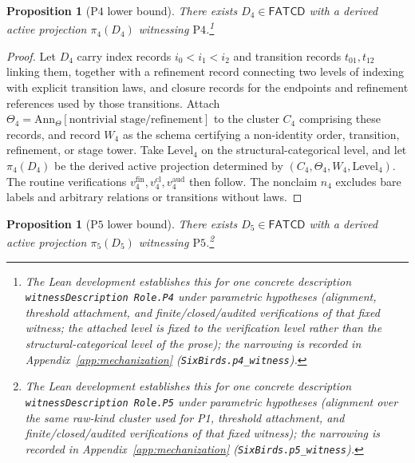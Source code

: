 \documentclass[11pt]{article}
\newtheorem{proposition}[theorem]{Proposition}
\theoremstyle{definition}
\newcommand{\FATCD}{\ensuremath{\mathsf{FATCD}}}
\newcommand{\Pfour}{\ensuremath{\mathrm{P4}}}
\newcommand{\Pfive}{\ensuremath{\mathrm{P5}}}
\begin{document}
\begin{proposition}[\Pfour{} lower bound]\label{prop:p4-witness}
There exists \(D_4 \in \FATCD{}\) with a derived active projection
\(\pi_4(D_4)\) witnessing \Pfour{}.\footnote{The Lean development establishes this for one concrete description \texttt{witnessDescription Role.P4} under parametric hypotheses (alignment, threshold attachment, and finite/closed/audited verifications of that fixed witness; the attached level is fixed to the verification level rather than the structural-categorical level of the prose); the narrowing is recorded in Appendix~\ref{app:mechanization} (\texttt{SixBirds.p4\_witness}).}
\end{proposition}

\begin{proof}
Let \(D_4\) carry index records \(i_0 < i_1 < i_2\) and transition
records \(t_{01}, t_{12}\) linking them, together with a refinement
record connecting two levels of indexing with explicit transition laws,
and closure records for the endpoints and refinement references used by
those transitions. Attach
\(\Theta_4 = \mathrm{Ann}_\Theta[\text{nontrivial stage/refinement}]\)
to the cluster \(C_4\) comprising these records, and record \(W_4\) as
the schema certifying a non-identity
order, transition, refinement, or stage tower. Take
\(\mathrm{Level}_4\) on the structural-categorical level, and let
\(\pi_4(D_4)\) be the derived active projection determined by
\((C_4,\Theta_4,W_4,\mathrm{Level}_4)\). The routine verifications
\(v_4^{\mathrm{fin}}, v_4^{\mathrm{cl}}, v_4^{\mathrm{aud}}\) then
follow. The nonclaim \(n_4\) excludes bare labels and arbitrary
relations or transitions without laws.
\end{proof}

\begin{proposition}[\Pfive{} lower bound]\label{prop:p5-witness}
There exists \(D_5 \in \FATCD{}\) with a derived active projection
\(\pi_5(D_5)\) witnessing \Pfive{}.\footnote{The Lean development establishes this for one concrete description \texttt{witnessDescription Role.P5} under parametric hypotheses (alignment over the same raw-kind cluster used for P1, threshold attachment, and finite/closed/audited verifications of that fixed witness); the narrowing is recorded in Appendix~\ref{app:mechanization} (\texttt{SixBirds.p5\_witness}).}
\end{proposition}
\end{document}
